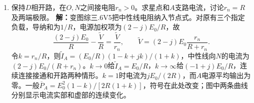 \documentclass[UTF8,fontset=fandol,a4paper,11pt]{ctexart}
\begin{document}
\begin{enumerate}
\item 保持$D$相开路，在$O,N$之间接电阻$r_n>0$。求星点和$A$支路电流，讨论$r_n=R$及两端极限。
\textbf{解：}变图综三.6V5把中性线电阻纳入节点式。对原有三个指定负载，导纳和为$1/R$，电源加权项为$(2-j)E_0/R$，故
\[
\frac{(2-j)E_0}{R}-\frac{\widetilde V}{R}
=\frac{\widetilde V}{r_n},\qquad
\widetilde V=(2-j)E_0\frac{r_n}{R+r_n}.
\]
令$k=r_n/R$，则$\widetilde I_A=(E_0/R)(1-k+jk)/(1+k)$，中性线向$N$的电流为$(2-j)E_0/(R+r_n)$。$k\to0$给$\widetilde I_A=E_0/R$，$k\to\infty$给$(-1+j)E_0/R$，连续连接接通和开路两种情形。$k=1$时电流为$jE_0/(2R)$，而$A$电源平均输出为零。一般$\overline P_A=E_0^2(1-k)/[2R(1+k)]$，符号在此处改变；图中两条曲线分别显示电流实部和虚部的连续变化。
\begin{center}\begin{minipage}{.98\linewidth}\centering
{}
\end{minipage}
\end{center}
\end{enumerate}
\end{document}
